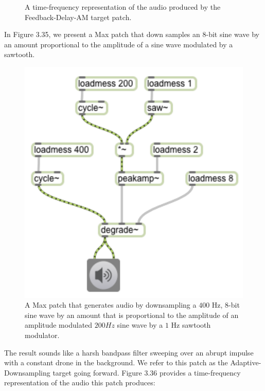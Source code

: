 \documentclass[a4paper,12pt]{report} 	%
\numberwithin{figure}{chapter}
\numberwithin{table}{chapter}
\numberwithin{equation}{chapter}
\begin{document}
\begin{flushleft}
\begin{figure}[h!]
\begin{center}
\caption[Delay Feedback AM Time-Frequency Representation]{A time-frequency representation of the audio produced by the Feedback-Delay-AM target patch.}
\end{center}
\end{figure}
In Figure 3.35, we present a Max patch that down samples an 8-bit sine wave by an amount proportional to the amplitude of a sine wave modulated by a sawtooth. 
\begin{figure}[h!]
\begin{center}
\includegraphics[scale=0.8]{AdaptiveDegrade}
\caption[Adaptive Downsampling Max Patch]{A Max patch that generates audio by downsampling a $400$ Hz, $8$-bit sine wave by an amount that is proportional to the amplitude of an amplitude modulated $200 Hz$ sine wave by a $1$ Hz sawtooth modulator.}
\end{center}
\end{figure}
The result sounds like a harsh bandpass filter sweeping over an abrupt impulse with a constant drone in the background. We refer to this patch as the Adaptive-Downsampling target going forward. Figure 3.36 provides a time-frequency representation of the audio this patch produces:
\begin{figure}[h!]
\begin{center}

\end{center}
\end{figure}
\end{flushleft}
\end{document}
